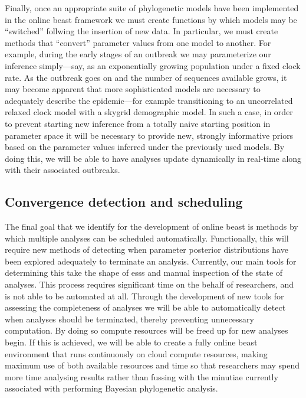 Finally, once an appropriate suite of phylogenetic models have been implemented in the online \gls{beast} framework we must create functions by which models may be ``switched'' follwing the insertion of new data.
In particular, we must create methods that ``convert'' parameter values from one model to another.
For example, during the early stages of an outbreak we may parameterize our inference simply---say, as an exponentially growing population under a fixed clock rate.
As the outbreak goes on and the number of sequences available grows, it may become apparent that more sophisticated models are necessary to adequately describe the epidemic---for example transitioning to an uncorrelated relaxed clock model with a skygrid demographic model.
In such a case, in order to prevent starting new inference from a totally naive starting position in parameter space it will be necessary to provide new, strongly informative priors based on the parameter values inferred under the previously used models.
By doing this, we will be able to have analyses update dynamically in real-time along with their associated outbreaks.

\subsection{Convergence detection and scheduling}

The final goal that we identify for the development of online \gls{beast} is methods by which multiple analyses can be scheduled automatically.
Functionally, this will require new methods of detecting when parameter posterior distributions have been explored adequately to terminate an analysis.
Currently, our main tools for determining this take the shape of \gls{ess}s and manual inspection of the state of analyses.
This process requires significant time on the behalf of researchers, and is not able to be automated at all.
Through the development of new tools for assessing the completeness of analyses we will be able to automatically detect when analyses should be terminated, thereby preventing unnecessary computation.
By doing so compute resources will be freed up for new analyses begin.
If this is achieved, we will be able to create a fully online \gls{beast} environment that runs continuously on cloud compute resources, making maximum use of both available resources and time so that researchers may spend more time analysing results rather than fussing with the minutiae currently associated with performing Bayesian phylogenetic analysis. 





\cleardoublepage

